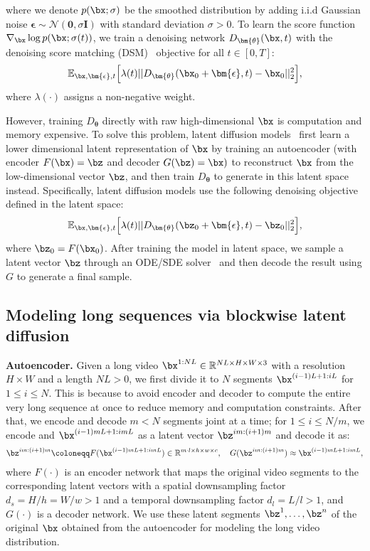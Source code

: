 where we denote $p(\bx; \sigma)$ be
the smoothed distribution by adding i.i.d Gaussian noise $\bm{\epsilon}\sim\mathcal{N}(\mathbf{0}, \sigma \mathbf{I})$ with standard deviation $\sigma > 0$. To learn the score function $\nabla_{\bx}\log p (\bx; \sigma(t))$, we train a denoising network $D_{\bm{\theta}} (\bx, t)$ with the denoising score matching (DSM)~\citep{song2019generative} objective for all $t \in [0, T]$:
\begin{align*}
\mathbb{E}_{\bx, \bm{\epsilon}, t}\Big[ \lambda({t}) || D_{\bm{\theta}}(\bx_0 + \bm{\epsilon}, t)  - \mathbf{\bx}_0||_2^2 \Big],
\end{align*}
where $\lambda(\cdot)$ assigns a non-negative weight.

However, training $D_{\bm{\theta}}$ directly with raw high-dimensional $\bx$ is computation and memory expensive. To solve this problem, latent diffusion models~\citep{rombach2021highresolution} first learn a 
lower dimensional latent representation of $\bx$ by training an autoencoder (with encoder $F(\bx) = \bz$ and 
decoder $G(\bz) = \bx)$ to reconstruct $\bx$ from 
the low-dimensional vector $\bz$, and then train $D_{\bm{\theta}}$ to generate in this latent space instead.
Specifically, latent diffusion models use the following denoising objective defined in the latent space:
\begin{align*}
    \mathbb{E}_{\bx, \bm{\epsilon}, t}\Big[ \lambda(t) || D_{\bm{\theta}}(\bz_0 + \bm{\epsilon}, t)  - \mathbf{\bz}_0||_2^2 \Big],
\end{align*}
where $\bz_0=F(\bx_0)$. After training the model in latent space, we sample a latent vector $\bz$ through an ODE/SDE solver~\citep{song2021denoising,song2021scorebased,karras2022edm} and then decode the result using $G$ to generate
a final sample.

\subsection{Modeling long sequences via blockwise latent diffusion}
\label{subsec:obj}
\textbf{Autoencoder.}
Given a long video $\bx^{1:NL} \in \mathbb{R}^{NL \times H \times W \times 3}$ with a resolution $H \times W$ and a length $NL>0$, we first divide it to $N$ segments $\bx^{(i-1)L+1:iL}$ for $1\leq i \leq N$. This is because to avoid encoder and decoder to compute the entire very long sequence at once to reduce memory and computation constraints. After that, we encode and decode $m<N$ segments joint at a time; for $1 \leq i \leq N/m$, we encode and $\bx^{(i-1)mL+1:imL}$ as a latent vector $\bz^{im:(i+1)m}$ and decode it as:
\begin{align*}
    \bz^{im:(i+1)m}\coloneqq F(\bx^{(i-1)mL+1:imL}) \in \mathbb{R}^{m\cdot l \times h \times w \times c},\quad G(\bz^{im:(i+1)m})\approx \bx^{(i-1)mL+1:imL},
\end{align*}
where $F(\cdot)$ is an encoder network that maps the original video segments to the corresponding latent vectors with a spatial downsampling factor $d_s = H/h = W/w > 1$ and a temporal downsampling factor $d_l = L/l > 1$, and $G(\cdot)$ is a decoder network. We use these latent segments $\bz^{1}, \ldots, \bz^{n}$ of the original $\bx$ obtained from the autoencoder for modeling the long video distribution.

